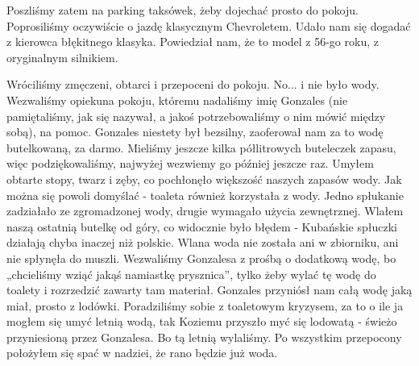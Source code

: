 Poszliśmy zatem na parking taksówek, żeby dojechać prosto do pokoju.
Poprosiliśmy oczywiście o jazdę klasycznym Chevroletem.
Udało nam się dogadać z kierowca błękitnego klasyka.
Powiedział nam, że to model z 56-go roku, z oryginalnym silnikiem.
\par Wróciliśmy zmęczeni, obtarci i przepoceni do pokoju.
No...
i nie było wody.
Wezwaliśmy opiekuna pokoju, któremu nadaliśmy imię Gonzales (nie pamiętaliśmy, jak się nazywał, a jakoś potrzebowaliśmy o nim mówić między sobą), na pomoc.
Gonzales niestety był bezsilny, zaoferował nam za to wodę butelkowaną, za darmo.
Mieliśmy jeszcze kilka półlitrowych buteleczek zapasu, więc podziękowaliśmy, najwyżej wezwiemy go później jeszcze raz.
Umyłem obtarte stopy, twarz i zęby, co pochłonęło większość naszych zapasów wody.
Jak można się powoli domyślać - toaleta również korzystała z wody.
Jedno spłukanie zadziałało ze zgromadzonej wody, drugie wymagało użycia zewnętrznej.
Wlałem naszą ostatnią butelkę od góry, co widocznie było błędem - Kubańskie spłuczki działają chyba inaczej niż polskie.
Wlana woda nie została ani w zbiorniku, ani nie spłynęła do muszli.
Wezwaliśmy Gonzalesa z prośbą o dodatkową wodę, bo „chcieliśmy wziąć jakąś namiastkę prysznica”, tylko żeby wylać tę wodę do toalety i rozrzedzić zawarty tam materiał.
Gonzales przyniósł nam całą wodę jaką miał, prosto z lodówki.
Poradziliśmy sobie z toaletowym kryzysem, za to o ile ja mogłem się umyć letnią wodą, tak Koziemu przyszło myć się lodowatą - świeżo przyniesioną przez Gonzalesa.
Bo tą letnią wylaliśmy.
Po wszystkim przepocony położyłem się spać w nadziei, że rano będzie już woda. 

